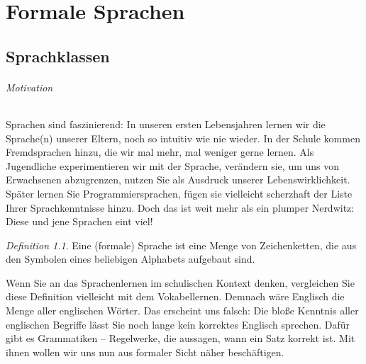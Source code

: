 \documentclass[11pt,a4paper]{scrreport}
\theoremstyle{remark}
\theoremstyle{custom}
\newtheorem{definition}{Definition}[section]
\begin{document}
\part{Formale Sprachen}
\chapter{Sprachklassen}
\paragraph{Motivation} Sprachen sind faszinierend: In unseren ersten Lebensjahren lernen wir die Sprache(n) unserer Eltern, noch so intuitiv wie nie wieder. In der Schule kommen Fremdsprachen hinzu, die wir mal mehr, mal weniger gerne lernen. Als Jugendliche experimentieren wir mit der Sprache, verändern sie, um uns von Erwachsenen abzugrenzen, nutzen Sie als Ausdruck unserer Lebenswirklichkeit. Später lernen Sie Programmiersprachen, fügen sie vielleicht scherzhaft der Liste Ihrer Sprachkenntnisse hinzu. Doch das ist weit mehr als ein plumper Nerdwitz: Diese und jene Sprachen eint viel!
\begin{definition}
Eine (formale) Sprache ist eine Menge von Zeichenketten, die aus den Symbolen eines beliebigen Alphabets aufgebaut sind. \parencite[vgl. ][S. 1]{Hopcroft}
\end{definition}
Wenn Sie an das Sprachenlernen im schulischen Kontext denken, vergleichen Sie diese Definition vielleicht mit dem Vokabellernen. Demnach wäre Englisch die Menge aller englischen Wörter. Das erscheint uns falsch: Die bloße Kenntnis aller englischen Begriffe lässt Sie noch lange kein korrektes Englisch sprechen. Dafür gibt es Grammatiken -- Regelwerke, die aussagen, wann ein Satz korrekt ist. Mit ihnen wollen wir uns nun aus formaler Sicht näher beschäftigen.
\end{document}
